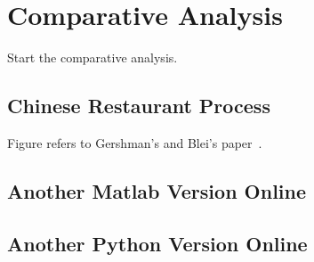 \section{Comparative Analysis}

Start the comparative analysis.

\subsection{Chinese Restaurant Process}

Figure refers to Gershman's and Blei's paper~\cite{gershman2012tutorial}.

\subsection{Another Matlab Version Online}

\subsection{Another Python Version Online}